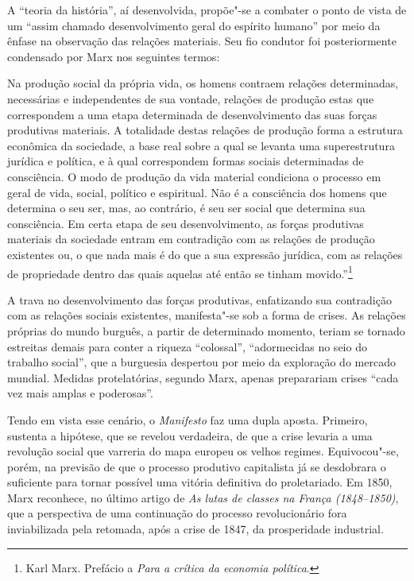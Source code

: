 A “teoria da história”, aí desenvolvida, propõe"-se a combater o ponto
de vista de um “assim chamado desenvolvimento geral do espírito humano”
por meio da ênfase na observação das relações materiais. Seu fio
condutor foi posteriormente condensado por Marx nos seguintes termos: 

\begin{hedraquote} 
Na produção social da própria vida, os homens contraem relações
determinadas, necessárias e independentes de sua vontade, relações de
produção estas que correspondem a uma etapa determinada de
desenvolvimento das suas forças produtivas materiais. A totalidade
destas relações de produção forma a estrutura econômica da sociedade, a
base real sobre a qual se levanta uma superestrutura jurídica e
política, e à qual correspondem formas sociais determinadas de
consciência. O modo de produção da vida material condiciona o processo
em geral de vida, social, político e espiritual. Não é a consciência
dos homens que determina o seu ser, mas, ao contrário, é seu ser social
que determina sua consciência. Em certa etapa de seu desenvolvimento,
as forças produtivas materiais da sociedade entram em contradição com
as relações de produção existentes  ou, o que nada mais é do que a sua
expressão jurídica, com as relações de propriedade dentro das quais
aquelas até então se tinham movido.”\footnote{ Karl Marx. Prefácio a
\textit{Para a crítica da economia política}.}
\end{hedraquote} 

A trava no desenvolvimento das forças produtivas, enfatizando sua
contradição com as relações sociais existentes, manifesta"-se sob a
forma de crises. As relações próprias do mundo burguês, a partir de
determinado momento, teriam se tornado estreitas demais para
conter a riqueza “colossal”, “adormecidas no seio do trabalho social”,
que a burguesia despertou por meio da exploração do mercado mundial.
Medidas protelatórias, segundo Marx, apenas preparariam crises “cada
vez mais amplas e poderosas”.

Tendo em vista esse cenário, o \textit{Manifesto} faz uma dupla aposta.
Primeiro, sustenta a hipótese, que se revelou verdadeira, de que a
crise levaria a uma revolução social que varreria do mapa europeu os
velhos regimes. Equivocou"-se, porém, na previsão de que o processo
produtivo capitalista já se desdobrara o suficiente para tornar
possível uma vitória definitiva do proletariado. Em 1850, Marx reconhece, no último artigo de\textit{ As lutas de classes na França 
(1848--1850)}, que a perspectiva de uma continuação do processo
revolucionário fora inviabilizada pela retomada, após a crise de 1847,
da prosperidade industrial.

